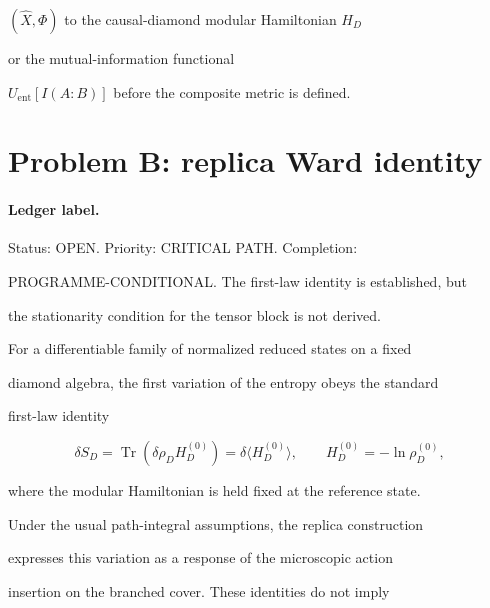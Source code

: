 \((\hat X,\Phi)\) to the causal-diamond modular Hamiltonian \(H_D\)

or the mutual-information functional

\(U_{\mathrm{ent}}[I(A:B)]\) before the composite metric is defined.







\section{Problem B: replica Ward identity}

\label{sec:detailed-Problem B: replica Ward identity}



\paragraph{Ledger label.} \label{detail:sec-B-paragraphledgerlabel-1}

Status: OPEN. Priority: CRITICAL PATH. Completion:

PROGRAMME-CONDITIONAL. The first-law identity is established, but

the stationarity condition for the tensor block is not derived.



For a differentiable family of normalized reduced states on a fixed

diamond algebra, the first variation of the entropy obeys the standard

first-law identity

\[

\delta S_D

=

\operatorname{Tr}(\delta\rho_D H_D^{(0)})

=

\delta\langle H_D^{(0)}\rangle,

\qquad

H_D^{(0)}=-\ln\rho_D^{(0)},

\]

where the modular Hamiltonian is held fixed at the reference state.

Under the usual path-integral assumptions, the replica construction

expresses this variation as a response of the microscopic action

insertion on the branched cover. These identities do not imply

